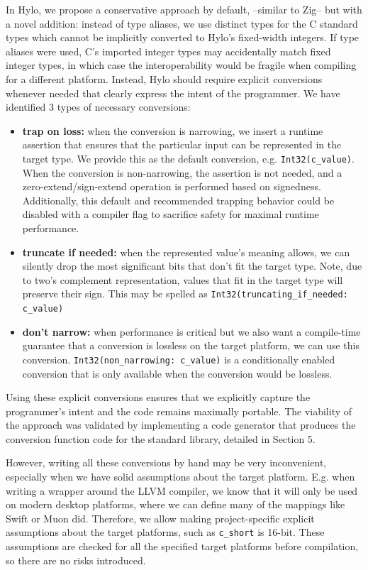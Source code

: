 In Hylo, we propose a conservative approach by default, --similar to Zig-- but with a novel addition: instead of type aliases, we use distinct types for the C standard types which cannot be implicitly converted to Hylo's fixed-width integers. If type aliases were used, C's imported integer types may accidentally match fixed integer types, in which case the interoperability would be fragile when compiling for a different platform. Instead, Hylo should require explicit conversions whenever needed that clearly express the intent of the programmer. We have identified 3 types of necessary conversions:
\begin{itemize}
    \item \textbf{trap on loss:} when the conversion is narrowing, we insert a runtime assertion that ensures that the particular input can be represented in the target type. We provide this as the default conversion, e.g. \texttt{Int32(c\_value)}. When the conversion is non-narrowing, the assertion is not needed, and a zero-extend/sign-extend operation is performed based on signedness. Additionally, this default and recommended trapping behavior could be disabled with a compiler flag to sacrifice safety for maximal runtime performance.
    \item \textbf{truncate if needed:} when the represented value's meaning allows, we can silently drop the most significant bits that don't fit the target type. Note, due to two's complement representation, values that fit in the target type will preserve their sign. This may be spelled as \texttt{Int32(truncating\_if\_needed: c\_value)}
    \item \textbf{don't narrow:} when performance is critical but we also want a compile-time guarantee that a conversion is lossless on the target platform, we can use this conversion. \texttt{Int32(non\_narrowing: c\_value)} is a conditionally enabled conversion that is only available when the conversion would be lossless.
\end{itemize}
Using these explicit conversions ensures that we explicitly capture the programmer's intent and the code remains maximally portable. The viability of the approach was validated by implementing a code generator that produces the conversion function code for the standard library, detailed in Section 5.

However, writing all these conversions by hand may be very inconvenient, especially when we have solid assumptions about the target platform. E.g. when writing a wrapper around the LLVM compiler, we know that it will only be used on modern desktop platforms, where we can define many of the mappings like Swift or Muon did. Therefore, we allow making project-specific explicit assumptions about the target platforms, such as \texttt{c\_short} is 16-bit. These assumptions are checked for all the specified target platforms before compilation, so there are no risks introduced.

